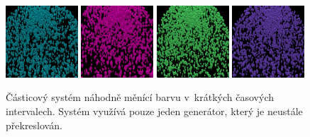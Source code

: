 \begin{figure}[H]
	\centering
	\includegraphics[width=0.24\textwidth]{obrazky-figures/disco1.png}
	\includegraphics[width=0.24\textwidth]{obrazky-figures/disco2.png}
	\includegraphics[width=0.24\textwidth]{obrazky-figures/disco3.png}
	\includegraphics[width=0.24\textwidth]{obrazky-figures/disco4.png}
	\caption{Částicový systém náhodně měnící barvu v~krátkých časových intervalech. Systém využívá pouze jeden generátor, který je neustále překreslován.}
	\label{fig:ps_disco}
\end{figure}

